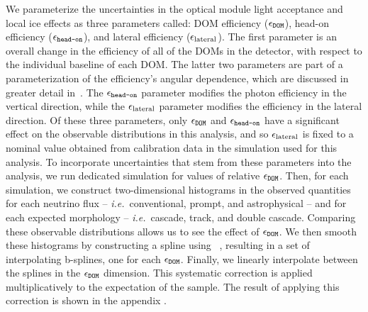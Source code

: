 We parameterize the uncertainties in the optical module light acceptance and local ice effects as three parameters called: DOM efficiency ($\epsilon_\texttt{DOM}$), head-on efficiency ($\epsilon_\texttt{head-on}$), and lateral efficiency ($\epsilon_\textmd{lateral}$).
The first parameter is an overall change in the efficiency of all of the DOMs in the detector, with respect to the individual baseline of each DOM.
The latter two parameters are part of a parameterization of the efficiency's angular dependence, which are discussed in greater detail in~\cite{Aartsen:2016nxy, Aartsen:2014yll, Aartsen:2017nmd}.
%
The $\epsilon_\texttt{head-on}$ parameter modifies the photon efficiency in the vertical direction, while the $\epsilon_\textmd{lateral}$ parameter modifies the efficiency in the lateral direction.
Of these three parameters, only $\epsilon_\texttt{DOM}$ and $\epsilon_\texttt{head-on}$ have a significant effect on the observable distributions in this analysis, and so $\epsilon_\textmd{lateral}$ is fixed to a nominal value obtained from calibration data in the simulation used for this analysis.
To incorporate uncertainties that stem from these parameters into the analysis, we run dedicated simulation for values of relative $\epsilon_\texttt{DOM}$.%
Then, for each simulation, we construct two-dimensional histograms in the observed quantities for each neutrino flux -- \textit{i.e.}\ conventional, prompt, and astrophysical -- and for each expected morphology -- \textit{i.e.}\ cascade, track, and double cascade.
Comparing these observable distributions allows us to see the effect of $\epsilon_\texttt{DOM}$.
We then smooth these histograms by constructing a spline using \PHOTOSPLINE~\cite{Whitehorn:2013nh,photospline}, resulting in a set of interpolating b-splines, one for each $\epsilon_\texttt{DOM}$.
Finally, we linearly interpolate between the splines in the $\epsilon_\texttt{DOM}$ dimension.
This systematic correction is applied multiplicatively to the expectation of the sample.
The result of applying this correction is shown in the appendix .

